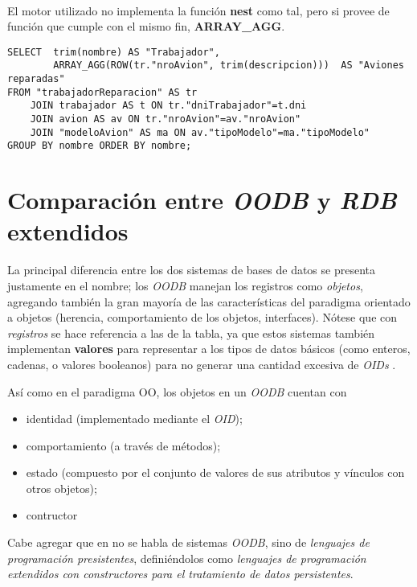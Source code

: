 ~\\

El motor utilizado no implementa la función \textbf{nest} como tal, pero si provee de función que cumple con el mismo fin, \textbf{ARRAY\_AGG}. 

\clearpage   

\vspace*{5mm}
\lstset{style=sql}
\begin{lstlisting}
SELECT  trim(nombre) AS "Trabajador", 
        ARRAY_AGG(ROW(tr."nroAvion", trim(descripcion)))  AS "Aviones reparadas"
FROM "trabajadorReparacion" AS tr 
    JOIN trabajador AS t ON tr."dniTrabajador"=t.dni 
    JOIN avion AS av ON tr."nroAvion"=av."nroAvion" 
    JOIN "modeloAvion" AS ma ON av."tipoModelo"=ma."tipoModelo" 
GROUP BY nombre ORDER BY nombre;
\end{lstlisting}



\section{Comparación entre \emph{OODB} y \emph{RDB} extendidos}

La principal diferencia entre los dos sistemas de bases de datos se presenta justamente en el nombre; los \emph{OODB} manejan los registros  como \emph{objetos}, agregando también la gran mayoría de las características del paradigma orientado a objetos (herencia, comportamiento de los objetos, interfaces). Nótese que con \emph{registros} se hace referencia a las  de la tabla, ya que estos sistemas también implementan \textbf{valores} para representar a los tipos de datos básicos (como enteros, cadenas, o valores booleanos) para no generar una cantidad excesiva de \emph{OIDs} \cite{elmasri}.

Así como en el paradigma OO, los objetos en un \emph{OODB} cuentan con
\begin{itemize}
    \item identidad (implementado mediante el \emph{OID});
    \item comportamiento (a través de métodos);
    \item estado (compuesto por el conjunto de valores de sus atributos y vínculos con otros objetos);
    \item contructor
\end{itemize}

Cabe agregar que en \cite{silberschatz} no se habla de sistemas \emph{OODB}, sino de \emph{lenguajes de programación presistentes}, definiéndolos como \emph{lenguajes de programación extendidos con constructores para el tratamiento de datos persistentes}.

